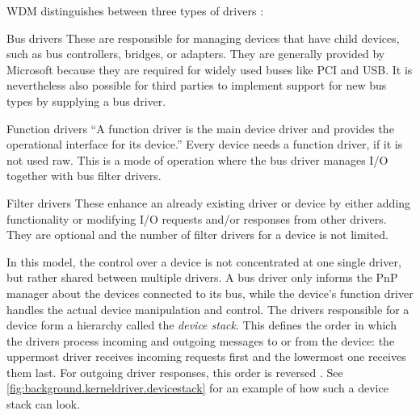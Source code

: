 WDM distinguishes between three types of drivers \cite{Yosifovich2017}:
\begin{descitemize}
	\item[Bus drivers] These are responsible for managing devices that have child devices, such as bus controllers, bridges, or adapters. They are generally provided by Microsoft because they are required for widely used buses like PCI and USB. It is nevertheless also possible for third parties to implement support for new bus types by supplying a bus driver.
	\item[Function drivers] ``A function driver is the main device driver and provides the operational interface for its device.'' \cite{Yosifovich2017} Every device needs a function driver, if it is not used raw. This is a mode of operation where the bus driver manages I/O together with bus filter drivers.
	\item[Filter drivers] These enhance an already existing driver or device by either adding functionality or modifying I/O requests and/or responses from other drivers. They are optional and the number of filter drivers for a device is not limited.
\end{descitemize}

In this model, the control over a device is not concentrated at one single driver, but rather shared between multiple drivers. A bus driver only informs the PnP manager about the devices connected to its bus, while the device's function driver handles the actual device manipulation and control. The drivers responsible for a device form a hierarchy called the \emph{device stack}. This defines the order in which the drivers process incoming and outgoing messages to or from the device: the uppermost driver receives incoming requests first and the lowermost one receives them last. For outgoing driver responses, this order is reversed \cite{Yosifovich2017}. See \autoref{fig:background.kerneldriver.devicestack} for an example of how such a device stack can look.

